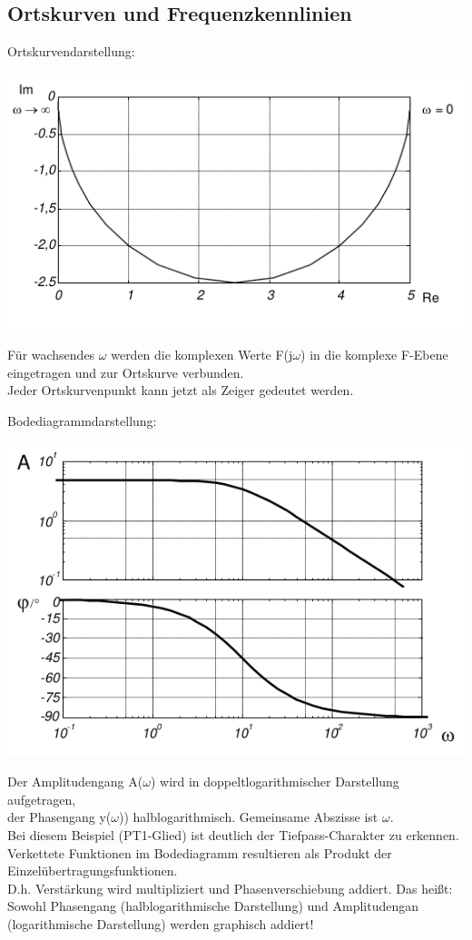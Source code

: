 \documentclass[10pt,a4paper]{article}
\begin{document}
\subsection{Ortskurven und Frequenzkennlinien}
    Ortskurvendarstellung:
    \begin{center}
    \includegraphics[width=.35\textwidth]{Figures/Ortskurve.png}
    \end{center}
    \begin{mdframed}[style=exercise]
    Für wachsendes $\omega$ werden die komplexen Werte F(j$\omega$) in die komplexe F-Ebene eingetragen und zur Ortskurve verbunden.\\
Jeder Ortskurvenpunkt kann jetzt als Zeiger gedeutet werden.\\
\end{mdframed}
    Bodediagrammdarstellung:
    \begin{center}
        \includegraphics[width=.35\textwidth]{Figures/Bodediagramm.png}
    \end{center}
    \begin{mdframed}[style=exercise]
    Der Amplitudengang A($\omega$) wird in doppeltlogarithmischer Darstellung aufgetragen,\\
    der Phasengang y($\omega$)) halblogarithmisch. Gemeinsame Abszisse ist $\omega$.\\
    Bei diesem Beispiel (PT1-Glied) ist deutlich der Tiefpass-Charakter zu erkennen.\\
    Verkettete Funktionen im Bodediagramm resultieren als Produkt der Einzelübertragungsfunktionen.\\
    D.h. Verstärkung wird multipliziert und Phasenverschiebung addiert.
    Das heißt: Sowohl Phasengang (halblogarithmische Darstellung) und Amplitudengan (logarithmische Darstellung) werden graphisch addiert!
\end{mdframed}
\end{document}
